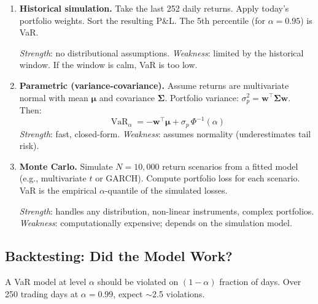 \documentclass[11pt, a4paper]{article}
\newcommand{\VaR}{\operatorname{VaR}}
\begin{document}
\begin{enumerate}
    \item \textbf{Historical simulation.}
    Take the last 252 daily returns.
    Apply today's portfolio weights.
    Sort the resulting P\&L.
    The 5th percentile (for $\alpha = 0.95$) is VaR.

    \textit{Strength}: no distributional assumptions.
    \textit{Weakness}: limited by the historical window.
    If the window is calm, VaR is too low.

    \item \textbf{Parametric (variance-covariance).}
    Assume returns are multivariate normal with mean $\bm{\mu}$ and covariance $\bm{\Sigma}$.
    Portfolio variance: $\sigma_p^2 = \bm{w}^\top \bm{\Sigma} \bm{w}$.
    Then:
    \[
        \VaR_\alpha = -\bm{w}^\top \bm{\mu} + \sigma_p \, \Phi^{-1}(\alpha)
    \]
    \textit{Strength}: fast, closed-form.
    \textit{Weakness}: assumes normality (underestimates tail risk).

    \item \textbf{Monte Carlo.}
    Simulate $N = 10{,}000$ return scenarios from a fitted model (e.g., multivariate $t$ or GARCH).
    Compute portfolio loss for each scenario.
    VaR is the empirical $\alpha$-quantile of the simulated losses.

    \textit{Strength}: handles any distribution, non-linear instruments, complex portfolios.
    \textit{Weakness}: computationally expensive; depends on the simulation model.
\end{enumerate}

\subsection{Backtesting: Did the Model Work?}

A VaR model at level $\alpha$ should be violated on $(1-\alpha)$ fraction of days.
Over 250 trading days at $\alpha = 0.99$, expect $\sim$2.5 violations.
\end{document}
